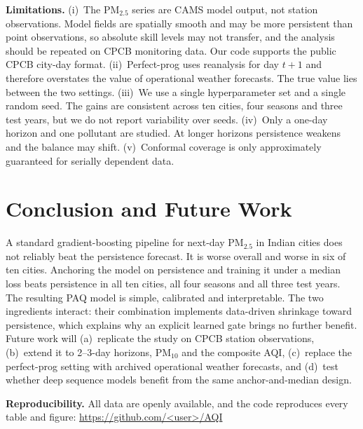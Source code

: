 \documentclass[conference]{IEEEtran}
\begin{document}
\textbf{Limitations.} (i)~The PM$_{2.5}$ series are CAMS model output, not
station observations. Model fields are spatially smooth and may be more persistent
than point observations, so absolute skill levels may not transfer, and the analysis should
be repeated on CPCB monitoring data. Our code supports the public CPCB city-day format.
(ii)~Perfect-prog uses reanalysis for day $t{+}1$ and therefore overstates the value of
operational weather forecasts. The true value lies between the two settings. (iii)~We use a single
hyperparameter set and a single random seed. The gains are consistent across ten cities, four
seasons and three test years, but we do not report variability over seeds. (iv)~Only a one-day
horizon and one pollutant are studied. At longer horizons persistence weakens and the balance may
shift. (v)~Conformal coverage is only approximately guaranteed for serially dependent data.

\section{Conclusion and Future Work}
A standard gradient-boosting pipeline for next-day PM$_{2.5}$ in Indian cities
does not reliably beat the persistence forecast. It is worse overall and worse in six of
ten cities. Anchoring the model on persistence and training it under a median loss
beats persistence in all ten cities, all four seasons and all three test years. The
resulting PAQ model is simple, calibrated and interpretable. The two ingredients
interact: their combination implements data-driven shrinkage toward persistence,
which explains why an explicit learned gate brings no further benefit. Future work will
(a)~replicate the study on CPCB station observations, (b)~extend it to 2--3-day
horizons, PM$_{10}$ and the composite AQI, (c)~replace the perfect-prog setting with
archived operational weather forecasts, and (d)~test whether deep sequence models benefit
from the same anchor-and-median design.

\textbf{Reproducibility.} All data are openly available, and the code reproduces every
table and figure: \url{https://github.com/<user>/AQI} %
\end{document}
